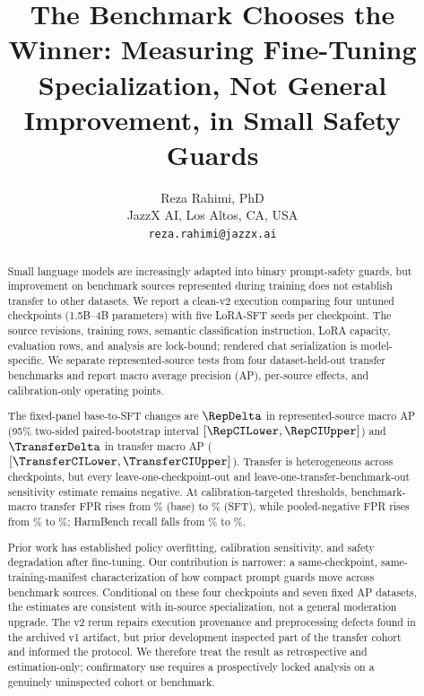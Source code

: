 \documentclass[11pt]{article}
\begin{document}
\title{The Benchmark Chooses the Winner: Measuring Fine-Tuning Specialization, Not General Improvement, in Small Safety Guards}

\author{Reza Rahimi, PhD\\
  \small JazzX AI, Los Altos, CA, USA\\
  \small\texttt{reza.rahimi@jazzx.ai}}
\date{}

\maketitle

\begin{abstract}
Small language models are increasingly adapted into binary prompt-safety guards, but improvement on benchmark sources represented during training does not establish transfer to other datasets. We report a clean-v2 execution comparing four untuned checkpoints (1.5B--4B parameters) with five LoRA-SFT seeds per checkpoint. The source revisions, training rows, semantic classification instruction, LoRA capacity, evaluation rows, and analysis are lock-bound; rendered chat serialization is model-specific. We separate represented-source tests from four dataset-held-out transfer benchmarks and report macro average precision (AP), per-source effects, and calibration-only operating points.

The fixed-panel base-to-SFT changes are $\RepDelta$ in represented-source macro AP (95\% two-sided paired-bootstrap interval $[\RepCILower,\RepCIUpper]$) and $\TransferDelta$ in transfer macro AP ($[\TransferCILower,\TransferCIUpper]$). Transfer is heterogeneous across checkpoints, but every leave-one-checkpoint-out and leave-one-transfer-benchmark-out sensitivity estimate remains negative. At calibration-targeted thresholds, benchmark-macro transfer FPR rises from \TransferBaseFPRPct\% (base) to \TransferSFTFPRPct\% (SFT), while pooled-negative FPR rises from \TransferBasePooledFPRPct\% to \TransferSFTPooledFPRPct\%; HarmBench recall falls from \HarmBenchBaseRecallPct\% to \HarmBenchSFTRecallPct\%.

Prior work has established policy overfitting, calibration sensitivity, and safety degradation after fine-tuning. Our contribution is narrower: a same-checkpoint, same-training-manifest characterization of how compact prompt guards move across benchmark sources. Conditional on these four checkpoints and seven fixed AP datasets, the estimates are consistent with in-source specialization, not a general moderation upgrade. The v2 rerun repairs execution provenance and preprocessing defects found in the archived v1 artifact, but prior development inspected part of the transfer cohort and informed the protocol. We therefore treat the result as retrospective and estimation-only; confirmatory use requires a prospectively locked analysis on a genuinely uninspected cohort or benchmark.
\end{abstract}
\end{document}
